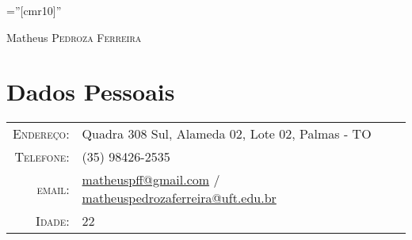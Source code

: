 \pagestyle{empty} %

\font\fb=''[cmr10]'' %

\par{\centering
		{\Huge Matheus \textsc{Pedroza Ferreira}
	}\bigskip\par}

\section{Dados Pessoais}

\begin{tabular}{rl}
    \textsc{Endereço:}   & Quadra 308 Sul, Alameda 02, Lote 02, Palmas - TO \\
    \textsc{Telefone:}   & (35) 98426-2535 \\
    \textsc{email:}      & \href{mailto:matheuspff@gmail.com}{matheuspff@gmail.com} / \href{mailto:matheuspedrozaferreira@uft.edu.br}{matheuspedrozaferreira@uft.edu.br}  \\
    \textsc{Idade:}      & 22 \\
\end{tabular}\\
